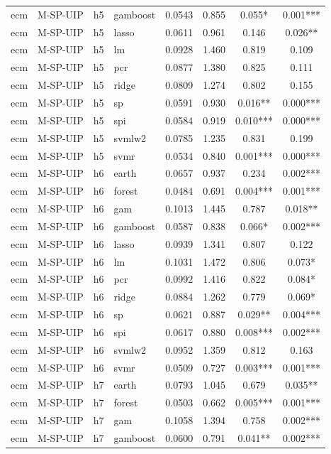 \begin{ThreePartTable}
\begin{longtable}[t]{llclcccc}
ecm & M-SP-UIP & h5 & gamboost & 0.0543 & 0.855 & 0.055* & 0.001***\\
ecm & M-SP-UIP & h5 & lasso & 0.0611 & 0.961 & 0.146 & 0.026**\\
ecm & M-SP-UIP & h5 & lm & 0.0928 & 1.460 & 0.819 & 0.109\\
ecm & M-SP-UIP & h5 & pcr & 0.0877 & 1.380 & 0.825 & 0.111\\
ecm & M-SP-UIP & h5 & ridge & 0.0809 & 1.274 & 0.802 & 0.155\\
ecm & M-SP-UIP & h5 & sp & 0.0591 & 0.930 & 0.016** & 0.000***\\
ecm & M-SP-UIP & h5 & spi & 0.0584 & 0.919 & 0.010*** & 0.000***\\
ecm & M-SP-UIP & h5 & svmlw2 & 0.0785 & 1.235 & 0.831 & 0.199\\
ecm & M-SP-UIP & h5 & svmr & 0.0534 & 0.840 & 0.001*** & 0.000***\\
\addlinespace
ecm & M-SP-UIP & h6 & earth & 0.0657 & 0.937 & 0.234 & 0.002***\\
ecm & M-SP-UIP & h6 & forest & 0.0484 & 0.691 & 0.004*** & 0.001***\\
ecm & M-SP-UIP & h6 & gam & 0.1013 & 1.445 & 0.787 & 0.018**\\
ecm & M-SP-UIP & h6 & gamboost & 0.0587 & 0.838 & 0.066* & 0.002***\\
ecm & M-SP-UIP & h6 & lasso & 0.0939 & 1.341 & 0.807 & 0.122\\
ecm & M-SP-UIP & h6 & lm & 0.1031 & 1.472 & 0.806 & 0.073*\\
ecm & M-SP-UIP & h6 & pcr & 0.0992 & 1.416 & 0.822 & 0.084*\\
ecm & M-SP-UIP & h6 & ridge & 0.0884 & 1.262 & 0.779 & 0.069*\\
ecm & M-SP-UIP & h6 & sp & 0.0621 & 0.887 & 0.029** & 0.004***\\
ecm & M-SP-UIP & h6 & spi & 0.0617 & 0.880 & 0.008*** & 0.002***\\
ecm & M-SP-UIP & h6 & svmlw2 & 0.0952 & 1.359 & 0.812 & 0.163\\
ecm & M-SP-UIP & h6 & svmr & 0.0509 & 0.727 & 0.003*** & 0.001***\\
\addlinespace
ecm & M-SP-UIP & h7 & earth & 0.0793 & 1.045 & 0.679 & 0.035**\\
ecm & M-SP-UIP & h7 & forest & 0.0503 & 0.662 & 0.005*** & 0.001***\\
ecm & M-SP-UIP & h7 & gam & 0.1058 & 1.394 & 0.758 & 0.002***\\
ecm & M-SP-UIP & h7 & gamboost & 0.0600 & 0.791 & 0.041** & 0.002***\\

\end{longtable}
\end{ThreePartTable}
